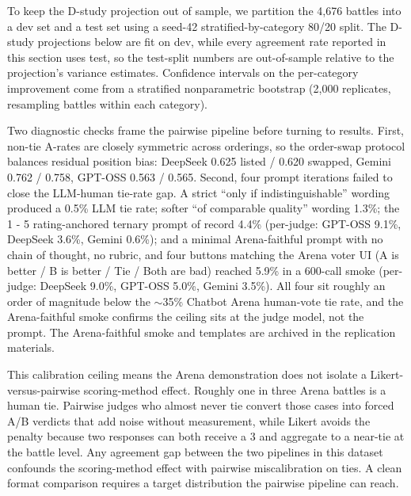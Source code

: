 To keep the D-study projection out of sample, we partition the 4,676 battles into a dev set and a test set using a seed-42 stratified-by-category 80/20 split. The D-study projections below are fit on dev, while every agreement rate reported in this section uses test, so the test-split numbers are out-of-sample relative to the projection's variance estimates. Confidence intervals on the per-category improvement come from a stratified nonparametric bootstrap (2,000 replicates, resampling battles within each category).

Two diagnostic checks frame the pairwise pipeline before turning to results. First, non-tie A-rates are closely symmetric across orderings, so the order-swap protocol balances residual position bias: DeepSeek 0.625 listed / 0.620 swapped, Gemini 0.762 / 0.758, GPT-OSS 0.563 / 0.565. Second, four prompt iterations failed to close the LLM-human tie-rate gap. A strict ``only if indistinguishable'' wording produced a 0.5\% LLM tie rate; softer ``of comparable quality'' wording 1.3\%; the 1 - 5 rating-anchored ternary prompt of record 4.4\% (per-judge: GPT-OSS 9.1\%, DeepSeek 3.6\%, Gemini 0.6\%); and a minimal Arena-faithful prompt with no chain of thought, no rubric, and four buttons matching the Arena voter UI (A is better / B is better / Tie / Both are bad) reached 5.9\% in a 600-call smoke (per-judge: DeepSeek 9.0\%, GPT-OSS 5.0\%, Gemini 3.5\%). All four sit roughly an order of magnitude below the $\sim$35\% Chatbot Arena human-vote tie rate, and the Arena-faithful smoke confirms the ceiling sits at the judge model, not the prompt. The Arena-faithful smoke and templates are archived in the replication materials.

This calibration ceiling means the Arena demonstration does not isolate a Likert-versus-pairwise scoring-method effect. Roughly one in three Arena battles is a human tie. Pairwise judges who almost never tie convert those cases into forced A/B verdicts that add noise without measurement, while Likert avoids the penalty because two responses can both receive a 3 and aggregate to a near-tie at the battle level. Any agreement gap between the two pipelines in this dataset confounds the scoring-method effect with pairwise miscalibration on ties. A clean format comparison requires a target distribution the pairwise pipeline can reach.

